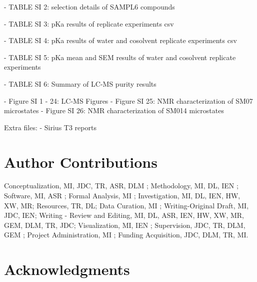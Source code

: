 \documentclass[9pt,lineno]{elife}
\begin{document}
- TABLE SI 2: selection details of SAMPL6 compounds  

- TABLE SI 3: pKa results of replicate experiments csv

- TABLE SI 4: pKa results of water and cosolvent replicate experiments csv

- TABLE SI 5: pKa mean and SEM results of water and cosolvent replicate experiments

- TABLE SI 6: Summary of LC-MS purity results

- Figure SI 1 - 24:  LC-MS Figures  
- Figure SI 25: NMR characterization of SM07 microstates
- Figure SI 26: NMR characterization of SM014 microstates


Extra files:  
- Sirius T3 reports  



\section{Author Contributions}

Conceptualization, MI, JDC, TR, ASR, DLM  ; Methodology, MI, DL, IEN ; Software, MI, ASR ; Formal Analysis, MI ; Investigation, MI, DL, IEN, HW, XW, MR; Resources, TR, DL;  Data Curation, MI ; Writing-Original Draft, MI, JDC, IEN; Writing - Review and Editing, MI, DL, ASR, IEN, HW, XW, MR, GEM, DLM, TR, JDC; Visualization, MI, IEN ; Supervision, JDC, TR, DLM, GEM ; Project Administration, MI ; Funding Acquisition, JDC, DLM, TR, MI. 


\section{Acknowledgments}
\end{document}

